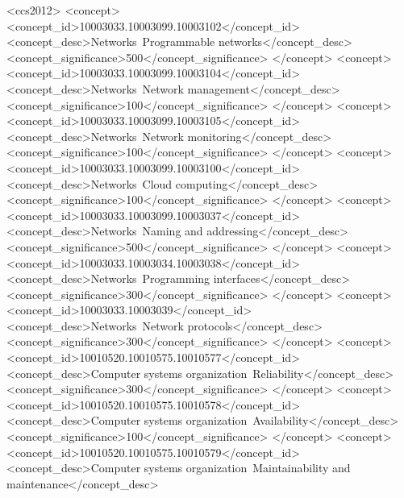 \keywords{
\TitlePageDataKeywords%
}%
%
%
%
%
%
%
\begin{CCSXML}
<ccs2012>
   <concept>
       <concept_id>10003033.10003099.10003102</concept_id>
       <concept_desc>Networks~Programmable networks</concept_desc>
       <concept_significance>500</concept_significance>
       </concept>
   <concept>
       <concept_id>10003033.10003099.10003104</concept_id>
       <concept_desc>Networks~Network management</concept_desc>
       <concept_significance>100</concept_significance>
       </concept>
   <concept>
       <concept_id>10003033.10003099.10003105</concept_id>
       <concept_desc>Networks~Network monitoring</concept_desc>
       <concept_significance>100</concept_significance>
       </concept>
   <concept>
       <concept_id>10003033.10003099.10003100</concept_id>
       <concept_desc>Networks~Cloud computing</concept_desc>
       <concept_significance>100</concept_significance>
       </concept>
   <concept>
       <concept_id>10003033.10003099.10003037</concept_id>
       <concept_desc>Networks~Naming and addressing</concept_desc>
       <concept_significance>500</concept_significance>
       </concept>
   <concept>
       <concept_id>10003033.10003034.10003038</concept_id>
       <concept_desc>Networks~Programming interfaces</concept_desc>
       <concept_significance>300</concept_significance>
       </concept>
   <concept>
       <concept_id>10003033.10003039</concept_id>
       <concept_desc>Networks~Network protocols</concept_desc>
       <concept_significance>300</concept_significance>
       </concept>
   <concept>
       <concept_id>10010520.10010575.10010577</concept_id>
       <concept_desc>Computer systems organization~Reliability</concept_desc>
       <concept_significance>300</concept_significance>
       </concept>
   <concept>
       <concept_id>10010520.10010575.10010578</concept_id>
       <concept_desc>Computer systems organization~Availability</concept_desc>
       <concept_significance>100</concept_significance>
       </concept>
   <concept>
       <concept_id>10010520.10010575.10010579</concept_id>
       <concept_desc>Computer systems organization~Maintainability and maintenance</concept_desc>

\end{CCSXML}
